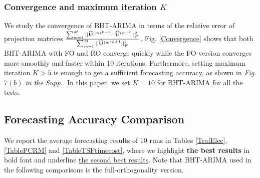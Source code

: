 \documentclass[letterpaper]{article} %
\numberwithin{theorem}{section}
\begin{document}
\subsubsection {Convergence and  maximum iteration $K$}
We study the convergence of BHT-ARIMA
in terms of the relative error  of projection matrices $ \scriptsize \frac{ \sum_{m=1}^{M} ||\widehat{ \mathbf U}{^{(m)}}^{k+1}  -\widehat{ \mathbf U}{^{(m)}}^{k} ||_F^2} {\sum_{m=1}^{M}||\widehat{ \mathbf U}{^{(m)}}^{k+1}||_F^2 }$.
Fig. \ref{Convergence}  shows that both  BHT-ARIMA     with  FO  and RO converge  quickly  while  the FO version  converges more smoothly and faster within 10 iterations.
Furthermore, setting maximum iteration  $K>5$ is enough to get a sufficient forecasting accuracy, as shown   in \textit{Fig. $7(b)$ in the Supp..}
In this paper, we set $K=10$  for  BHT-ARIMA for all the tests.







\subsection{Forecasting Accuracy Comparison}

We report the  average forecasting results of 10 runs in Tables \ref{TrafElec}, \ref{TablePCRM} and  \ref{TableTSFtimecost},  where we highlight \textbf{the best results} in bold font and underline \underline{the second best results}. Note that BHT-ARIMA used in the following comparisons is the full-orthogonality version.
\end{document}
